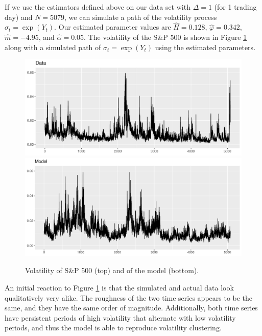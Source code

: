If we use the estimators defined above on our data set with $\Delta=1$ (for 1 trading day) and $N=5079$, we can simulate a path of the volatility process $\sigma_{t}=\exp(Y_{t})$. Our estimated parameter values are $\hat{H}=0.128$, $\hat{\varphi}=0.342$, $\hat{m} = -4.95$, and $\hat{\alpha} = 0.05$. The volatility of the S\&P 500 is shown in Figure \ref{fig:datavol_modelvol} along with a simulated path of $\sigma_{t}=\exp(Y_{t})$ using the estimated parameters.
\begin{figure}[H]
    \centering
    \includegraphics[scale=0.65]{fig/img/RealizedLib/RealizedVolWithoutDates.pdf}
    \includegraphics[scale=0.6]{fig/img/RealizedLib/simulated_vol_ny.pdf}
    \caption{Volatility of S\&P 500 (top) and of the model (bottom).}
    \label{fig:datavol_modelvol}
\end{figure}
An initial reaction to Figure \ref{fig:datavol_modelvol} is that the simulated and actual data look qualitatively very alike. The roughness of the two time series appears to be the same, and they have the same order of magnitude. Additionally, both time series have persistent periods of high volatility that alternate with low volatility periods, and thus the model is able to reproduce volatility clustering.

